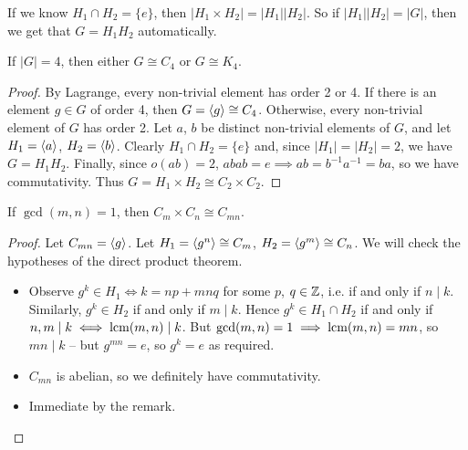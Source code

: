 \documentclass{../../template/note}
\begin{document}
    \begin{remark*}
        If we know \(H_1 \cap H_2 = \{e\}\), then \(|H_1 \times H_2| = |H_1||H_2|\). So if \(|H_1||H_2| = |G|\), then we get that \(G = H_1H_2\) automatically.
    \end{remark*}
    
    \begin{lemma}
        If \(|G| = 4\), then either \(G \cong C_4\) or \(G \cong K_4\).
    \end{lemma}
    
    \begin{proof}
        By Lagrange, every non-trivial element has order 2 or 4. If there is an element \(g \in G\) of order 4, then \(G = \left \langle g \right \rangle \cong C_4\). Otherwise, every non-trivial element of \(G\) has order 2. Let \(a\), \(b\) be distinct non-trivial elements of \(G\), and let \(H_1 = \left \langle a \right \rangle\), \(H_2 = \left \langle b \right \rangle\). Clearly \(H_1 \cap H_2 = \{e\}\) and, since \(|H_1| = |H_2| = 2\), we have \(G = H_1H_2\). Finally, since \(o(ab) = 2\), \(abab = e \implies ab = b^{-1}a^{-1} = ba\), so we have commutativity. Thus \(G = H_1 \times H_2 \cong C_2 \times C_2\).
    \end{proof}
    
    \begin{theorem}
        If \(\gcd(m, n) = 1\), then \(C_m \times C_n \cong C_{mn}\).
        \label{chinese-remainder-theorem}
    \end{theorem}
    
    \begin{proof}
        Let \(C_{mn} = \left \langle g \right \rangle\). Let \(H_1 = \left \langle g^n \right \rangle \cong C_m\), \(H_2 = \left \langle g^m \right \rangle \cong C_n\). We will check the hypotheses of the direct product theorem.
        \begin{itemize}
            \item Observe \(g^k \in H_1 \iff k = np + mnq\) for some \(p\), \(q \in \mathbb Z\), i.e. if and only if \(n \mid k\). Similarly, \(g^k \in H_2\) if and only if \(m \mid k\). Hence \(g^k \in H_1 \cap H_2\) if and only if \(n, m \mid k \iff \operatorname*{lcm}(m, n) \mid k\). But \(\gcd(m, n) = 1 \implies \operatorname*{lcm}(m, n) = mn\), so \(mn \mid k\) -- but \(g^{mn} = e\), so \(g^k = e\) as required.
            \item \(C_{mn}\) is abelian, so we definitely have commutativity.
            \item Immediate by the remark.
        \end{itemize}
    \end{proof}
    
\end{document}
